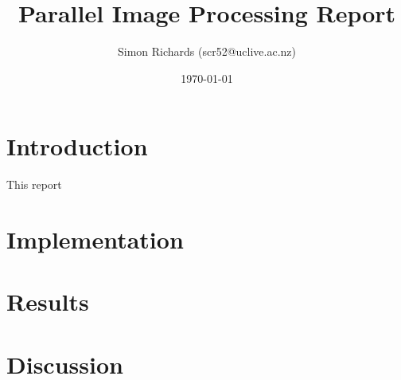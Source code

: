 \documentclass{article}
\title{Parallel Image Processing Report}
\date{\today}
\author{Simon Richards (scr52@uclive.ac.nz)}
\begin{document}
\maketitle
\section{Introduction}
This report

\section{Implementation}

\section{Results}

\section{Discussion}
\end{document}
